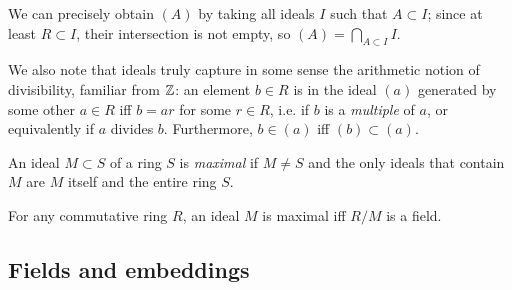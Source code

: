 We can precisely obtain $(A)$ by taking all ideals $I$ such that $A\subset I$; since at least $R\subset I$, their intersection is not empty, so $(A)=\bigcap_{A\subset I} I$.

We also note that ideals truly capture in some sense the arithmetic notion of divisibility, familiar from $\mathbb{Z}$: an element $b\in R$ is in the ideal $(a)$ generated by some other $a\in R$ iff $b=ar$ for some $r\in R$, i.e. if $b$ is a \emph{multiple} of $a$, or equivalently if $a$ divides $b$. Furthermore, $b\in(a)$ iff $(b)\subset(a)$.

\begin{defn}
	An ideal $M\subset S$ of a ring $S$ is \emph{maximal} if $M\neq S$ and the only ideals that contain $M$ are $M$ itself and the entire ring $S$.
\end{defn}

\begin{prop}
	For any commutative ring $R$, an ideal $M$ is maximal iff $R/M$ is a field.
\end{prop}




\subsection{Fields and embeddings}







